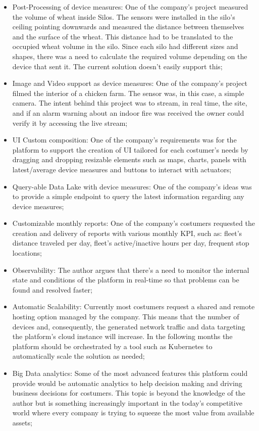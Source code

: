 \begin{itemize}
    \item Post-Processing of device measures: One of the company's project measured the volume of wheat inside Silos. The sensors were installed in the silo's ceiling pointing downwards and measured the distance between themselves and the surface of the wheat. This distance had to be translated to the occupied wheat volume in the silo. Since each silo had different sizes and shapes, there was a need to calculate the required volume depending on the device that sent it. The current solution doesn't easily support this;
    \item Image and Video support as device measures: One of the company's project filmed the interior of a chicken farm. The sensor was, in this case, a simple camera. The intent behind this project was to stream, in real time, the site, and if an alarm warning about an indoor fire was received the owner could verify it by accessing the live stream;
    \item UI Custom composition: One of the company's requirements was for the platform to support the creation of \gls{UI} tailored for each costumer's needs by dragging and dropping resizable elements such as maps, charts, panels with latest/average device measures and buttons to interact with actuators;
    \item Query-able Data Lake with device measures: One of the company's ideas was to provide a simple endpoint to query the latest information regarding any device measures;
    \item Customizable monthly reports: One of the company's costumers requested the creation and delivery of reports with various monthly \gls{KPI}, such as: fleet's distance traveled per day, fleet's active/inactive hours per day, frequent stop locations;
    \item Observability: The author argues that there's a need to monitor the internal state and conditions of the platform in real-time so that problems can be found and resolved faster;
    \item Automatic Scalability: Currently most costumers request a shared and remote hosting option managed by the company. This means that the number of devices and, consequently, the generated network traffic and data targeting the platform's cloud instance will increase. In the following months the platform should be orchestrated by a tool such as Kubernetes to automatically scale the solution as needed;
    \item Big Data analytics: Some of the most advanced features this platform could provide would be automatic analytics to help decision making and driving business decisions for costumers. This topic is beyond the knowledge of the author but is something increasingly important in the today's competitive world where every company is trying to squeeze the most value from available assets;

\end{itemize}

